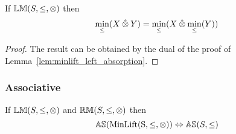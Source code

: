\documentclass[../Summary.tex]{subfiles}
\begin{document}
\vspace{2em}




\begin{lemma} \label{lem:minlift_right_absorption}
If ${\mathbb{LM}}(S,\leq,\otimes)$ then
\begin{equation*}
\min_\leq(X \mathbin{\hat{\otimes}} Y) = \min_\leq(X \mathbin{\hat{\otimes}} \min_\leq(Y))
\end{equation*}
\end{lemma}

\begin{proof} The result can be obtained by the dual of the proof of Lemma~\ref{lem:minlift_left_absorption}.
\end{proof}
 



\subsubsection{Associative}

\begin{theorem} \label{thm:minlift_as}
If ${\mathbb{LM}}(S,\leq,\otimes)$ and ${\mathbb{RM}}(S,\leq,\otimes)$ then
\begin{equation*}
{\mathbb{AS}}(\mathrm{MinLift(S,\leq,\otimes)}) \Leftrightarrow {\mathbb{AS}}(S,\leq)
\end{equation*}
\end{theorem}
\end{document}
